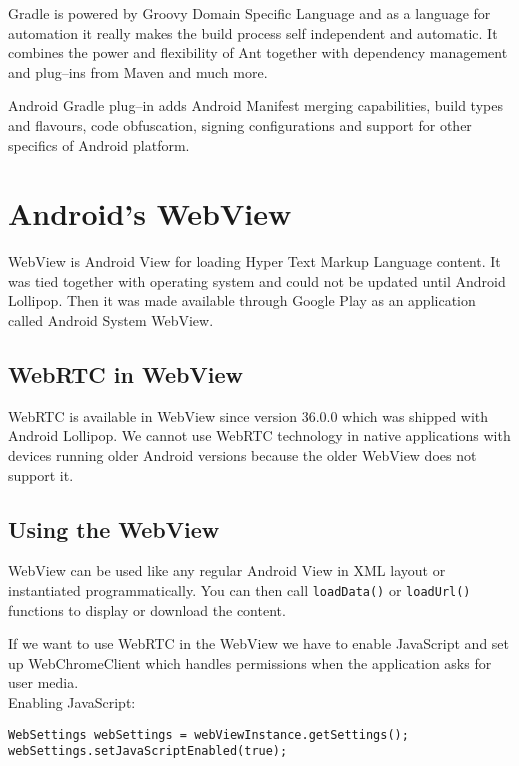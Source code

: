 Gradle is powered by Groovy Domain Specific Language and as a language for automation it really makes the build process self independent and automatic. It combines the power and flexibility of Ant together with dependency management and plug--ins from Maven and much more.

Android Gradle plug--in adds Android Manifest merging capabilities, build types and flavours, code obfuscation, signing configurations and support for other specifics of Android platform.





\section{Android's WebView}
WebView is Android View for loading Hyper Text Markup Language content. It was tied together with operating system and could not be updated until Android Lollipop. Then it was made available through Google Play as an application called Android System WebView.

\subsection{WebRTC in WebView}
WebRTC is available in WebView since version 36.0.0 which was shipped with Android Lollipop. We cannot use WebRTC technology in native applications with devices running older Android versions because the older WebView does not support it.

\subsection{Using the WebView}
WebView can be used like any regular Android View in XML layout or instantiated programmatically. You can then call \verb|loadData()| or \verb|loadUrl()| functions to display or download the content.

If we want to use WebRTC in the WebView we have to enable JavaScript and set up WebChromeClient which handles permissions when the application asks for user media.\\

\vspace{0.5em}
\noindent\vspace{-0.3em}\noindent
Enabling JavaScript:
\begin{lstlisting}
WebSettings webSettings = webViewInstance.getSettings();
webSettings.setJavaScriptEnabled(true);
\end{lstlisting}

